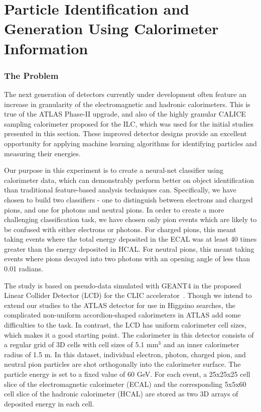 \chapter{Particle Identification and Generation Using Calorimeter Information}

\subsection{The Problem}

The next generation of detectors currently under development often feature an increase in granularity of the electromagnetic and hadronic calorimeters. This is true of the ATLAS Phase-II upgrade, and also of the highly granular CALICE sampling calorimeter proposed for the ILC, which was used for the initial studies presented in this section. These improved detector designs provide an excellent opportunity for applying machine learning algorithms for identifying particles and measuring their energies.

Our purpose in this experiment is to create a neural-net classifier using calorimeter data, which can demonstrably perform better on object identification than traditional feature-based analysis techniques can. Specifically, we have chosen to build two classifiers - one to distinguish between electrons and charged pions, and one for photons and neutral pions. In order to create a more challenging classification task, we have chosen only pion events which are likely to be confused with either electrons or photons. For charged pions, this meant taking events where the total energy deposited in the ECAL was at least 40 times greater than the energy deposited in HCAL. For neutral pions, this meant taking events where pions decayed into two photons with an opening angle of less than 0.01 radians.

The study is based on pseudo-data simulated with GEANT4 in the proposed Linear Collider Detector (LCD) for the CLIC accelerator~\cite{Lebrun}. Though we intend to extend our studies to the ATLAS detector for use in Higgsino searches, the complicated non-uniform accordion-shaped calorimeters in ATLAS add some difficulties to the task. In contrast, the LCD has uniform calorimeter cell sizes, which makes it a good starting point. The calorimeter in this detector consists of a regular grid of 3D cells with cell sizes of 5.1 mm$^3$ and an inner calorimeter radius of 1.5 m. In this dataset, individual electron, photon, charged pion, and neutral pion particles are shot orthogonally into the calorimeter surface. The particle energy is set to a fixed value of 60 GeV. For each event, a 25x25x25 cell slice of the electromagnetic calorimeter (ECAL) and the corresponding 5x5x60 cell slice of the hadronic calorimeter (HCAL) are stored as two 3D arrays of deposited energy in each cell.

